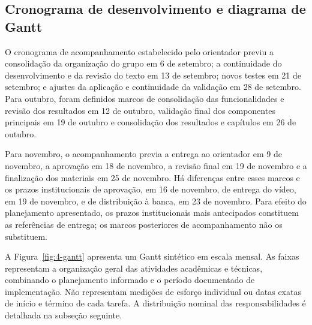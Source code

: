 \subsection{Cronograma de desenvolvimento e diagrama de Gantt}

O cronograma de acompanhamento estabelecido pelo orientador previu a consolidação da organização do grupo em 6 de setembro; a continuidade do desenvolvimento e da revisão do texto em 13 de setembro; novos testes em 21 de setembro; e ajustes da aplicação e continuidade da validação em 28 de setembro. Para outubro, foram definidos marcos de consolidação das funcionalidades e revisão dos resultados em 12 de outubro, validação final dos componentes principais em 19 de outubro e consolidação dos resultados e capítulos em 26 de outubro.

Para novembro, o acompanhamento previa a entrega ao orientador em 9 de novembro, a aprovação em 18 de novembro, a revisão final em 19 de novembro e a finalização dos materiais em 25 de novembro. Há diferenças entre esses marcos e os prazos institucionais de aprovação, em 16 de novembro, de entrega do vídeo, em 19 de novembro, e de distribuição à banca, em 23 de novembro. Para efeito do planejamento apresentado, os prazos institucionais mais antecipados constituem as referências de entrega; os marcos posteriores de acompanhamento não os substituem.

A Figura~\ref{fig:4-gantt} apresenta um Gantt sintético em escala mensal. As faixas representam a organização geral das atividades acadêmicas e técnicas, combinando o planejamento informado e o período documentado de implementação. Não representam medições de esforço individual ou datas exatas de início e término de cada tarefa. A distribuição nominal das responsabilidades é detalhada na subseção seguinte.

